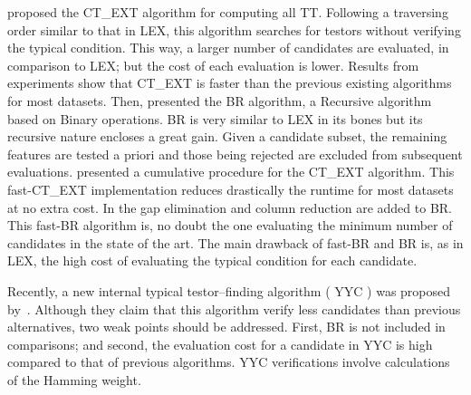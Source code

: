 \documentclass[authoryear,11pt]{elsarticle}
\makeatletter
\newcommand{\setword}[2]{%
  \phantomsection
  #1\def\@currentlabel{\unexpanded{#1}}\label{#2}%
}
\makeatother
\begin{document}
  \cite{Sanchez07} proposed the \setword{CT\_EXT}{CTEXT} algorithm for computing all
  TT. Following a traversing order similar to that in LEX, this algorithm searches for
  testors without verifying the typical condition. This way, a larger number of candidates are 
  evaluated, in comparison to LEX; but the cost of each evaluation is lower. Results from experiments
  show that CT\_EXT is faster than the previous existing algorithms for most datasets. Then, \cite{Lias09}
  presented the \setword{BR}{BR} algorithm, a Recursive algorithm based on 
  Binary operations. BR is very similar to LEX in its bones but its recursive nature encloses a great
  gain. Given a candidate subset, the remaining features are tested a priori and those being rejected are
  excluded from subsequent evaluations. \cite{Sanchez10} presented a cumulative
  procedure for the CT\_EXT algorithm. This fast-CT\_EXT implementation reduces drastically the runtime
  for most datasets at no extra cost. In \citep{Lias13} the
  gap elimination and column reduction are added to BR. This fast-BR algorithm is, no doubt the one 
  evaluating the minimum number of candidates in the state of the art. The main drawback of fast-BR and 
  BR is, as in LEX, the high cost of evaluating the typical condition for each candidate. 
 
  Recently, a new internal typical testor--finding algorithm (\setword{YYC}{YYC}) was proposed by~\cite{Alba14}. Although 
  they claim that this algorithm verify less candidates than previous alternatives, two weak points should
  be addressed. First, BR is not included in comparisons; and second, the evaluation cost for a candidate
  in YYC is high compared to that of previous algorithms. YYC verifications involve calculations of the 
  Hamming weight.
\end{document}
